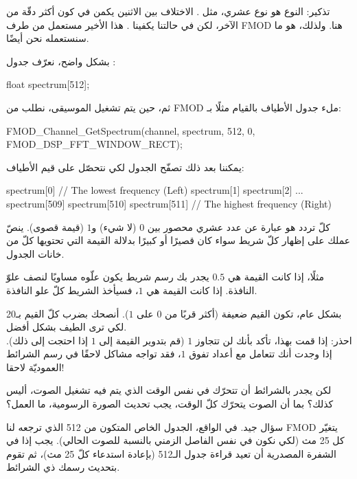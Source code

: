 \begin{information}
تذكير: النوع
هو نوع عشري، مثل
.
الاختلاف بين الاثنين يكمن في كون
أكثر دقّة من الآخر، لكن في حالتنا يكفينا
.
هذا الأخير مستعمل من طرف
\textenglish{FMOD}
هنا. ولذلك، هو ما سنستعمله نحن أيضًا.
\end{information}

بشكل واضح، نعرّف جدول
:

\begin{Csource}
float spectrum[512];
\end{Csource}

ثم، حين يتم تشغيل الموسيقى، نطلب من 
\textenglish{FMOD}
ملء جدول الأطياف بالقيام مثلًا بـ:

\begin{Csource}
FMOD_Channel_GetSpectrum(channel, spectrum, 512, 0, FMOD_DSP_FFT_WINDOW_RECT);
\end{Csource}

يمكننا بعد ذلك تصفّح الجدول لكي نتحصّل على قيم الأطياف:

\begin{Csource}
spectrum[0] // The lowest frequency (Left)
spectrum[1]
spectrum[2]
...
spectrum[509]
spectrum[510]
spectrum[511] // The highest frequency (Right)
\end{Csource}

كلّ تردد هو عبارة عن عدد عشري محصور بين $ 0 $ (لا شيء) و$ 1 $ (قيمة قصوى). ينصّ عملك على إظهار كلّ شريط سواء كان قصيرًا أو كبيرًا بدلالة القيمة التي تحتويها كلّ من خانات الجدول.

مثلًا، إذا كانت القيمة هي $ 0.5 $ يجدر بك رسم شريط يكون علّوه مساويًا لنصف علوّ النافذة. إذا كانت القيمة هي $ 1 $، فسيأخذ الشريط كلّ علو النافذة.

بشكل عام، تكون القيم ضعيفة (أكثر قربًا من $ 0 $ على $ 1 $). أنصحك بضرب كلّ القيم بـ20 لكي ترى الطيف بشكل أفضل.\\
احذر: إذا قمت بهذا، تأكد بأنك لن تتجاوز $ 1 $ (قم بتدوير القيمة إلى $ 1 $ إذا احتجت إلى ذلك). إذا وجدت أنك تتعامل مع أعداد تفوق $ 1 $، فقد تواجه مشاكل لاحقًا في رسم الشرائط العموديّة لاحقا!

\begin{question}
لكن يجدر بالشرائط أن تتحرّك في نفس الوقت الذي يتم فيه تشغيل الصوت، أليس كذلك؟ بما أن الصوت يتحرّك كلّ الوقت، يجب تحديث الصورة الرسومية، ما العمل؟
\end{question}

سؤال جيد. في الواقع، الجدول الخاص المتكون من 
512 
الذي ترجعه لنا
\textenglish{FMOD}
يتغيّر كل 25 مث (لكي نكون في نفس الفاصل الزمني بالنسبة للصوت الحالي). يجب إذا في الشفرة المصدرية أن تعيد قراءة جدول الـ512
 (بإعادة استدعاء
 كلّ 25 مث)، ثم تقوم بتحديث رسمك ذي الشرائط.
 
